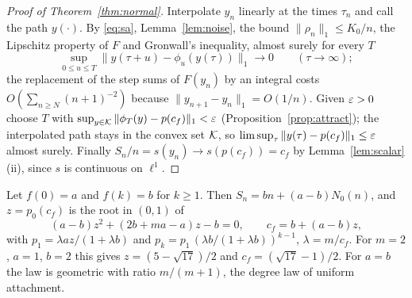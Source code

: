 \begin{proof}[Proof of Theorem~\ref{thm:normal}]
Interpolate $y_n$ linearly at the times $\tau_n$ and call the path $y(\cdot)$. By \eqref{eq:sa},
Lemma~\ref{lem:noise}, the bound $\|\rho_n\|_1\le K_0/n$, the Lipschitz property of $F$ and Gronwall's inequality,
almost surely for every $T$
\[
   \sup_{0\le u\le T}\bigl\|y(\tau+u)-\phi_u(y(\tau))\bigr\|_1\to0\qquad(\tau\to\infty);
\]
the replacement of the step sums of $F(y_n)$ by an integral costs $O(\sum_{n\ge N}(n+1)^{-2})$ because
$\|y_{n+1}-y_n\|_1=O(1/n)$. Given $\varepsilon>0$ choose $T$ with $\sup_{y\in\mathcal{K}}\|\phi_T(y)-p(c_f)\|_1<\varepsilon$
(Proposition~\ref{prop:attract}); the interpolated path stays in the convex set $\mathcal{K}$, so
$\limsup_{\tau}\|y(\tau)-p(c_f)\|_1\le\varepsilon$ almost surely. Finally $S_n/n=s(y_n)\to s(p(c_f))=c_f$ by
Lemma~\ref{lem:scalar}(ii), since $s$ is continuous on $\ell^1$.
\end{proof}

\begin{example}\label{ex:two}
Let $f(0)=a$ and $f(k)=b$ for $k\ge1$. Then $S_n=bn+(a-b)N_0(n)$, and $z=p_0(c_f)$ is the root in $(0,1)$ of
\[
   (a-b)z^2+(2b+ma-a)z-b=0,\qquad c_f=b+(a-b)z ,
\]
with $p_1=\lambda az/(1+\lambda b)$ and $p_k=p_1\,(\lambda b/(1+\lambda b))^{k-1}$, $\lambda=m/c_f$. For $m=2$,
$a=1$, $b=2$ this gives $z=(5-\sqrt{17})/2$ and $c_f=(\sqrt{17}-1)/2$. For $a=b$ the law is geometric with ratio
$m/(m+1)$, the degree law of uniform attachment.
\end{example}
